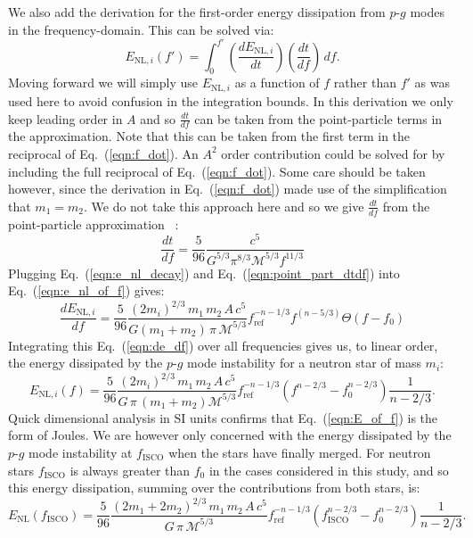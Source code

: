 We also add the derivation for the first-order energy dissipation from $p$-$g$ modes in the frequency-domain. This can be solved via:
\begin{equation}\label{eqn:e_nl_of_f}
    E_{\mathrm{NL}, i}\left(f'\right) = \int_0^{f'} \left(\frac{dE_{\mathrm{NL}, i}}{dt} \right) \left(\frac{dt}{df}\right) \, df.
\end{equation}
Moving forward we will simply use $E_{\mathrm{NL}, i}$ as a function of $f$ rather than $f'$ as was used here to avoid confusion in the integration bounds. In this derivation we only keep leading order in $A$ and so $\frac{dt}{df}$ can be taken from the point-particle terms in the approximation. Note that this can be taken from the first term in the reciprocal of Eq.~(\ref{eqn:f_dot}). An $A^2$ order contribution could be solved for by including the full reciprocal of Eq.~(\ref{eqn:f_dot}). Some care should be taken however, since the derivation in Eq.~(\ref{eqn:f_dot}) made use of the simplification that $m_1 = m_2$. We do not take this approach here and so we give $\frac{dt}{df}$ from the point-particle approximation ~\citep{maggiore2008gravitational}:
\begin{equation}\label{eqn:point_part_dtdf}
    \frac{dt}{df} = \frac{5}{96} \frac{c^5}{G^{5/3}  \pi^{8/3} \mathcal{M}^{5/3} f^{11/3}}
\end{equation}
Plugging Eq.~(\ref{eqn:e_nl_decay}) and Eq.~(\ref{eqn:point_part_dtdf}) into Eq.~(\ref{eqn:e_nl_of_f}) gives:
\begin{equation}\label{eqn:de_df}
    \frac{dE_{\mathrm{NL}, i}}{df} = \frac{5}{96} \frac{\left(2 m_i\right)^{2/3} \, m_1 \, m_2 \, A \, c^5}{G (m_1 + m_2)\, \pi \, \mathcal{M}^{5/3}} f_{\mathrm{ref}}^{-n-1/3} f^{(n-5/3)} \Theta(f-f_0)
\end{equation}
Integrating this Eq.~(\ref{eqn:de_df}) over all frequencies gives us, to linear order, the energy dissipated by the $p$-$g$ mode instability for a neutron star of mass $m_i$:
\begin{equation}\label{eqn:E_of_f}
    E_{\mathrm{NL}, i}(f) = \frac{5}{96} \frac{\left(2 m_i\right)^{2/3} \, m_1 \, m_2 \, A \, c^5}{G \, \pi \, (m_1 + m_2) \mathcal{M}^{5/3}} f_{\mathrm{ref}}^{-n-1/3} \left(f^{n-2/3} -f_0^{n-2/3}\right) \frac{1}{n-2/3}.
\end{equation}
Quick dimensional analysis in SI units confirms that Eq.~(\ref{eqn:E_of_f}) is the form of Joules. We are however only concerned with the energy dissipated by the $p$-$g$ mode instability at $f_{\mathrm{ISCO}}$ when the stars have finally merged. For neutron stars $f_{\mathrm{ISCO}}$ is always greater than $f_0$ in the cases considered in this study, and so this energy dissipation, summing over the contributions from both stars, is:
\begin{equation}\label{eqn:E_of_fisco}
    E_{\mathrm{NL}}(f_{\mathrm{ISCO}}) =  \frac{5}{96} \frac{\left(2 m_1 + 2 m_2 \right)^{2/3} \, m_1 \, m_2 \, A \, c^5}{G \, \pi \, \mathcal{M}^{5/3}} f_{\mathrm{ref}}^{-n-1/3} \left(f_{\mathrm{ISCO}}^{n-2/3} -f_0^{n-2/3}\right) \frac{1}{n-2/3}.
\end{equation}

